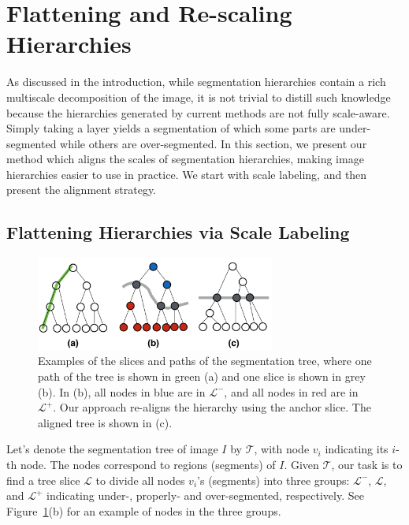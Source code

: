\section{Flattening and Re-scaling  Hierarchies}
\label{sec:scaling}
As discussed in the introduction, while segmentation
hierarchies contain a rich multiscale decomposition of the image, it is
not trivial to distill such knowledge because the hierarchies
generated by current methods are not fully scale-aware. Simply taking
a layer yields a segmentation of which some parts are under-segmented
while others are over-segmented. In this section, we present our
method which aligns the scales of segmentation hierarchies, making
image hierarchies easier to use in practice. We start with scale
labeling, and then present the alignment strategy.


\subsection{Flattening Hierarchies via Scale Labeling}
\label{sec:scale:labeling}


\begin{figure}
\begin{center}
\includegraphics[width=0.7\textwidth]{scale-aware/fig/illu.png}
\end{center}
\caption{Examples of the slices and paths of the segmentation tree,
  where one path of the tree is shown in green (a) and one slice is shown
  in grey (b).  In (b), all nodes
  in blue are in $\mathcal{L}^-$, and all nodes in red are in
  $\mathcal{L}^+$. Our approach re-aligns the hierarchy using the
  anchor slice. The aligned tree is shown in (c).}
\label{fig:hier_opt}
\end{figure}


Let's denote the segmentation tree of image $I$ by $\mathcal{T}$, with
node $v_i$ indicating its $i$-th node. The nodes correspond to regions
(segments) of $I$.  Given $\mathcal{T}$, our task is to find a tree
slice $\mathcal{L}$ to divide all nodes $v_i$'s (segments) into three
groups: $\mathcal{L}^-$, $\mathcal{L}$, and $\mathcal{L}^+$ indicating
under-, properly- and over-segmented, respectively. See
Figure~\ref{fig:hier_opt}(b) for an example of nodes in the three
groups.

